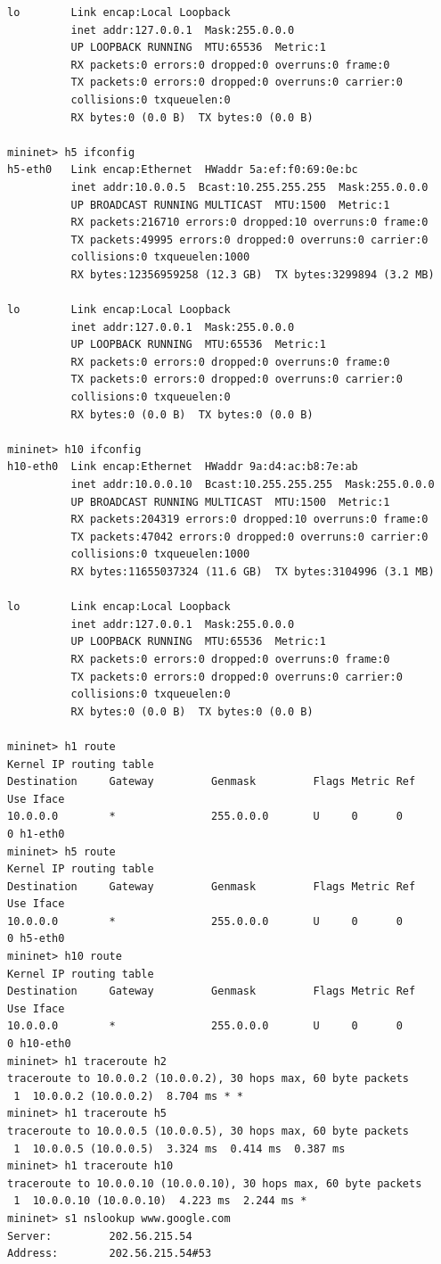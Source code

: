 \documentclass[a4paper, 11pt]{article}
\begin{document}
\begin{appendices}
\begin{lstlisting}[style=BashInputStyle]
lo        Link encap:Local Loopback
          inet addr:127.0.0.1  Mask:255.0.0.0
          UP LOOPBACK RUNNING  MTU:65536  Metric:1
          RX packets:0 errors:0 dropped:0 overruns:0 frame:0
          TX packets:0 errors:0 dropped:0 overruns:0 carrier:0
          collisions:0 txqueuelen:0
          RX bytes:0 (0.0 B)  TX bytes:0 (0.0 B)

mininet> h5 ifconfig
h5-eth0   Link encap:Ethernet  HWaddr 5a:ef:f0:69:0e:bc
          inet addr:10.0.0.5  Bcast:10.255.255.255  Mask:255.0.0.0
          UP BROADCAST RUNNING MULTICAST  MTU:1500  Metric:1
          RX packets:216710 errors:0 dropped:10 overruns:0 frame:0
          TX packets:49995 errors:0 dropped:0 overruns:0 carrier:0
          collisions:0 txqueuelen:1000
          RX bytes:12356959258 (12.3 GB)  TX bytes:3299894 (3.2 MB)

lo        Link encap:Local Loopback
          inet addr:127.0.0.1  Mask:255.0.0.0
          UP LOOPBACK RUNNING  MTU:65536  Metric:1
          RX packets:0 errors:0 dropped:0 overruns:0 frame:0
          TX packets:0 errors:0 dropped:0 overruns:0 carrier:0
          collisions:0 txqueuelen:0
          RX bytes:0 (0.0 B)  TX bytes:0 (0.0 B)

mininet> h10 ifconfig
h10-eth0  Link encap:Ethernet  HWaddr 9a:d4:ac:b8:7e:ab
          inet addr:10.0.0.10  Bcast:10.255.255.255  Mask:255.0.0.0
          UP BROADCAST RUNNING MULTICAST  MTU:1500  Metric:1
          RX packets:204319 errors:0 dropped:10 overruns:0 frame:0
          TX packets:47042 errors:0 dropped:0 overruns:0 carrier:0
          collisions:0 txqueuelen:1000
          RX bytes:11655037324 (11.6 GB)  TX bytes:3104996 (3.1 MB)

lo        Link encap:Local Loopback
          inet addr:127.0.0.1  Mask:255.0.0.0
          UP LOOPBACK RUNNING  MTU:65536  Metric:1
          RX packets:0 errors:0 dropped:0 overruns:0 frame:0
          TX packets:0 errors:0 dropped:0 overruns:0 carrier:0
          collisions:0 txqueuelen:0
          RX bytes:0 (0.0 B)  TX bytes:0 (0.0 B)

mininet> h1 route
Kernel IP routing table
Destination     Gateway         Genmask         Flags Metric Ref    Use Iface
10.0.0.0        *               255.0.0.0       U     0      0        0 h1-eth0
mininet> h5 route
Kernel IP routing table
Destination     Gateway         Genmask         Flags Metric Ref    Use Iface
10.0.0.0        *               255.0.0.0       U     0      0        0 h5-eth0
mininet> h10 route
Kernel IP routing table
Destination     Gateway         Genmask         Flags Metric Ref    Use Iface
10.0.0.0        *               255.0.0.0       U     0      0        0 h10-eth0
mininet> h1 traceroute h2
traceroute to 10.0.0.2 (10.0.0.2), 30 hops max, 60 byte packets
 1  10.0.0.2 (10.0.0.2)  8.704 ms * *
mininet> h1 traceroute h5
traceroute to 10.0.0.5 (10.0.0.5), 30 hops max, 60 byte packets
 1  10.0.0.5 (10.0.0.5)  3.324 ms  0.414 ms  0.387 ms
mininet> h1 traceroute h10
traceroute to 10.0.0.10 (10.0.0.10), 30 hops max, 60 byte packets
 1  10.0.0.10 (10.0.0.10)  4.223 ms  2.244 ms *
mininet> s1 nslookup www.google.com
Server:         202.56.215.54
Address:        202.56.215.54#53


\end{lstlisting}
\end{appendices}
\end{document}
